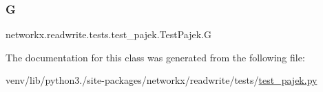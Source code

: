 \subsubsection{\texorpdfstring{G}{G}}
{\footnotesize\ttfamily networkx.\+readwrite.\+tests.\+test\+\_\+pajek.\+Test\+Pajek.\+G}



The documentation for this class was generated from the following file\+:\begin{DoxyCompactItemize}
\item 
venv/lib/python3./site-\/packages/networkx/readwrite/tests/\hyperlink{test__pajek_8py}{test\+\_\+pajek.\+py}\end{DoxyCompactItemize}
